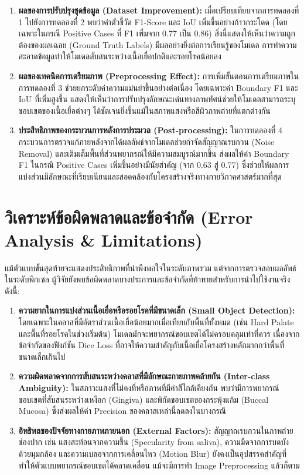 \begin{enumerate}
    \item \textbf{ผลของการปรับปรุงชุดข้อมูล (Dataset Improvement):} เมื่อเปรียบเทียบจากการทดลองที่ 1 ไปยังการทดลองที่ 2 พบว่าค่าตัวชี้วัด F1-Score และ IoU เพิ่มขึ้นอย่างก้าวกระโดด (โดยเฉพาะในกรณี Positive Cases ที่ F1 เพิ่มจาก 0.77 เป็น 0.86) สิ่งนี้แสดงให้เห็นว่าความถูกต้องของผลเฉลย (Ground Truth Labels) มีผลอย่างยิ่งต่อการเรียนรู้ของโมเดล การทำความสะอาดข้อมูลทำให้โมเดลสับสนระหว่างเนื้อเยื่อปกติและรอยโรคน้อยลง
    \item \textbf{ผลของเทคนิคการเตรียมภาพ (Preprocessing Effect):} การเพิ่มขั้นตอนการเตรียมภาพในการทดลองที่ 3 ช่วยยกระดับค่าความแม่นยำขึ้นอย่างต่อเนื่อง โดยเฉพาะค่า Boundary F1 และ IoU ที่เพิ่มสูงขึ้น แสดงให้เห็นว่าการปรับปรุงลักษณะเด่นทางภาพทัศน์ช่วยให้โมเดลสามารถระบุขอบเขตของเนื้อเยื่อต่างๆ ได้ชัดเจนยิ่งขึ้นแม้ในสภาพแสงหรือสีผิวภาพถ่ายที่แตกต่างกัน
    \item \textbf{ประสิทธิภาพของกระบวนการหลังการประมวล (Post-processing):} ในการทดลองที่ 4 กระบวนการตรวจแก้ภายหลังจากได้ผลลัพธ์จากโมเดลช่วยกำจัดสัญญาณรบกวน (Noise Removal) และเติมเต็มพื้นที่ส่วนพยากรณ์ให้มีความสมบูรณ์มากขึ้น ส่งผลให้ค่า Boundary F1 ในกรณี Positive Cases เพิ่มขึ้นอย่างมีนัยสำคัญ (จาก 0.63 สู่ 0.77) ซึ่งช่วยให้ผลการแบ่งส่วนมีลักษณะที่เรียบเนียนและสอดคล้องกับโครงสร้างจริงทางกายวิภาคศาสตร์มากที่สุด
\end{enumerate}

\section{วิเคราะห์ข้อผิดพลาดและข้อจำกัด (Error Analysis \& Limitations)}
แม้ตัวแบบขั้นสุดท้ายจะแสดงประสิทธิภาพที่น่าพึงพอใจในระดับภาพรวม แต่จากการตรวจสอบผลลัพธ์ในระดับพิกเซล ผู้วิจัยยังพบข้อผิดพลาดบางประการและข้อจำกัดที่ท้าทายสำหรับการนำไปใช้งานจริง ดังนี้:

\begin{enumerate}
    \item \textbf{ความยากในการแบ่งส่วนเนื้อเยื่อหรือรอยโรคที่มีขนาดเล็ก (Small Object Detection):} โดยเฉพาะในคลาสที่มีอัตราส่วนเนื้อเยื่อน้อยมากเมื่อเทียบกับพื้นที่ทั้งหมด (เช่น Hard Palate และพื้นที่รอยโรคในช่วงเริ่มต้น) โมเดลมักจะพยากรณ์ขอบเขตได้ไม่ครอบคลุมเท่าที่ควร เนื่องจากข้อจำกัดของฟังก์ชัน Dice Loss ที่อาจให้ความสำคัญกับเนื้อเยื่อโครงสร้างหลักมากกว่าพื้นที่ขนาดเล็กเกินไป
    \item \textbf{ความผิดพลาดจากการสับสนระหว่างคลาสที่มีลักษณะกายภาพคล้ายกัน (Inter-class Ambiguity):} ในสภาวะแสงที่ไม่คงที่หรือภาพที่มีค่าสีใกล้เคียงกัน พบว่ามีการพยากรณ์ขอบเขตที่สับสนระหว่างเหงือก (Gingiva) และพิกัดขอบเขตของกระพุ้งแก้ม (Buccal Mucosa) ซึ่งส่งผลให้ค่า Precision ของคลาสเหล่านี้ลดลงในบางกรณี
    \item \textbf{อิทธิพลของปัจจัยทางกายภาพภายนอก (External Factors):} สัญญาณรบกวนในภาพถ่ายช่องปาก เช่น แสงสะท้อนจากความชื้น (Specularity from saliva), ความมืดจากการบดบังด้วยมุมกล้อง และความเบลอจากการเคลื่อนไหว (Motion Blur) ยังคงเป็นอุปสรรคสำคัญที่ทำให้ตัวแบบพยากรณ์ขอบเขตได้คลาดเคลื่อน แม้จะมีการทำ Image Preprocessing แล้วก็ตาม
\end{enumerate}

